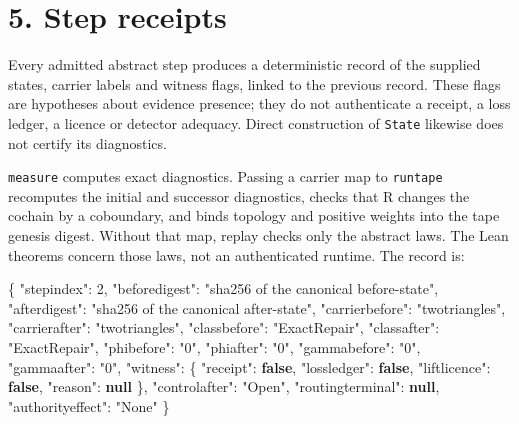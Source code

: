 \documentclass[
  11pt,
]{article}
\newenvironment{Shaded}{}{}
\newcommand{\DataTypeTok}[1]{\textcolor[rgb]{0.56,0.13,0.00}{#1}}
\newcommand{\DecValTok}[1]{\textcolor[rgb]{0.25,0.63,0.44}{#1}}
\newcommand{\FunctionTok}[1]{\textcolor[rgb]{0.02,0.16,0.49}{#1}}
\newcommand{\KeywordTok}[1]{\textcolor[rgb]{0.00,0.44,0.13}{\textbf{#1}}}
\newcommand{\StringTok}[1]{\textcolor[rgb]{0.25,0.44,0.63}{#1}}
\renewcommand{\_}{\ddcunderscore\allowbreak}
\begin{document}
\section{5. Step receipts}\label{step-receipts}

Every admitted abstract step produces a deterministic record of the
supplied states, carrier labels and witness flags, linked to the
previous record. These flags are hypotheses about evidence presence;
they do not authenticate a receipt, a loss ledger, a licence or detector
adequacy. Direct construction of \texttt{State} likewise does not
certify its diagnostics.

\texttt{measure} computes exact diagnostics. Passing a carrier map to
\texttt{run\_tape} recomputes the initial and successor diagnostics,
checks that R changes the cochain by a coboundary, and binds topology
and positive weights into the tape genesis digest. Without that map,
replay checks only the abstract laws. The Lean theorems concern those
laws, not an authenticated runtime. The record is:

\begin{Shaded}
\begin{Highlighting}[]
\FunctionTok{\{}
  \DataTypeTok{"step\_index"}\FunctionTok{:} \DecValTok{2}\FunctionTok{,}
  \DataTypeTok{"before\_digest"}\FunctionTok{:} \StringTok{"sha256 of the canonical before{-}state"}\FunctionTok{,}
  \DataTypeTok{"after\_digest"}\FunctionTok{:} \StringTok{"sha256 of the canonical after{-}state"}\FunctionTok{,}
  \DataTypeTok{"carrier\_before"}\FunctionTok{:} \StringTok{"two\_triangles"}\FunctionTok{,}
  \DataTypeTok{"carrier\_after"}\FunctionTok{:} \StringTok{"two\_triangles"}\FunctionTok{,}
  \DataTypeTok{"class\_before"}\FunctionTok{:} \StringTok{"ExactRepair"}\FunctionTok{,}
  \DataTypeTok{"class\_after"}\FunctionTok{:} \StringTok{"ExactRepair"}\FunctionTok{,}
  \DataTypeTok{"phi\_before"}\FunctionTok{:} \StringTok{"0"}\FunctionTok{,} \DataTypeTok{"phi\_after"}\FunctionTok{:} \StringTok{"0"}\FunctionTok{,}
  \DataTypeTok{"gamma\_before"}\FunctionTok{:} \StringTok{"0"}\FunctionTok{,} \DataTypeTok{"gamma\_after"}\FunctionTok{:} \StringTok{"0"}\FunctionTok{,}
  \DataTypeTok{"witness"}\FunctionTok{:} \FunctionTok{\{}
    \DataTypeTok{"receipt"}\FunctionTok{:} \KeywordTok{false}\FunctionTok{,}
    \DataTypeTok{"loss\_ledger"}\FunctionTok{:} \KeywordTok{false}\FunctionTok{,}
    \DataTypeTok{"lift\_licence"}\FunctionTok{:} \KeywordTok{false}\FunctionTok{,}
    \DataTypeTok{"reason"}\FunctionTok{:} \KeywordTok{null}
  \FunctionTok{\},}
  \DataTypeTok{"control\_after"}\FunctionTok{:} \StringTok{"Open"}\FunctionTok{,}
  \DataTypeTok{"routing\_terminal"}\FunctionTok{:} \KeywordTok{null}\FunctionTok{,}
  \DataTypeTok{"authority\_effect"}\FunctionTok{:} \StringTok{"None"}
\FunctionTok{\}}
\end{Highlighting}
\end{Shaded}
\end{document}
